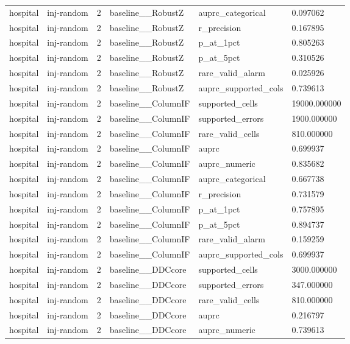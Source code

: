 \begin{tabular}{llllll}
hospital & inj-random & 2 & baseline\_\_RobustZ & auprc\_categorical & 0.097062 \\
hospital & inj-random & 2 & baseline\_\_RobustZ & r\_precision & 0.167895 \\
hospital & inj-random & 2 & baseline\_\_RobustZ & p\_at\_1pct & 0.805263 \\
hospital & inj-random & 2 & baseline\_\_RobustZ & p\_at\_5pct & 0.310526 \\
hospital & inj-random & 2 & baseline\_\_RobustZ & rare\_valid\_alarm & 0.025926 \\
hospital & inj-random & 2 & baseline\_\_RobustZ & auprc\_supported\_cols & 0.739613 \\
hospital & inj-random & 2 & baseline\_\_ColumnIF & supported\_cells & 19000.000000 \\
hospital & inj-random & 2 & baseline\_\_ColumnIF & supported\_errors & 1900.000000 \\
hospital & inj-random & 2 & baseline\_\_ColumnIF & rare\_valid\_cells & 810.000000 \\
hospital & inj-random & 2 & baseline\_\_ColumnIF & auprc & 0.699937 \\
hospital & inj-random & 2 & baseline\_\_ColumnIF & auprc\_numeric & 0.835682 \\
hospital & inj-random & 2 & baseline\_\_ColumnIF & auprc\_categorical & 0.667738 \\
hospital & inj-random & 2 & baseline\_\_ColumnIF & r\_precision & 0.731579 \\
hospital & inj-random & 2 & baseline\_\_ColumnIF & p\_at\_1pct & 0.757895 \\
hospital & inj-random & 2 & baseline\_\_ColumnIF & p\_at\_5pct & 0.894737 \\
hospital & inj-random & 2 & baseline\_\_ColumnIF & rare\_valid\_alarm & 0.159259 \\
hospital & inj-random & 2 & baseline\_\_ColumnIF & auprc\_supported\_cols & 0.699937 \\
hospital & inj-random & 2 & baseline\_\_DDCcore & supported\_cells & 3000.000000 \\
hospital & inj-random & 2 & baseline\_\_DDCcore & supported\_errors & 347.000000 \\
hospital & inj-random & 2 & baseline\_\_DDCcore & rare\_valid\_cells & 810.000000 \\
hospital & inj-random & 2 & baseline\_\_DDCcore & auprc & 0.216797 \\
hospital & inj-random & 2 & baseline\_\_DDCcore & auprc\_numeric & 0.739613 \\

\end{tabular}
